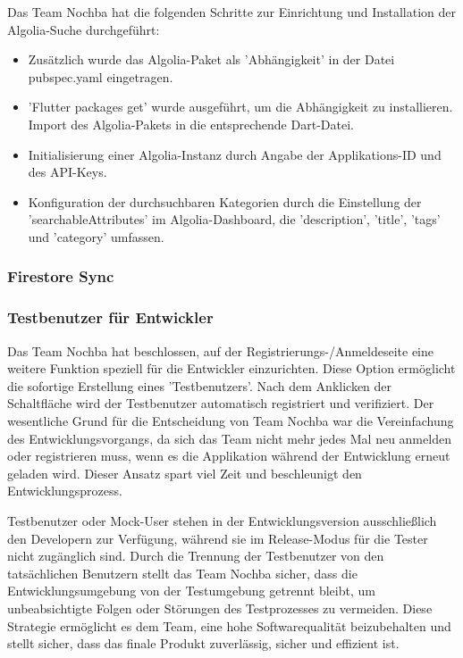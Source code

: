 Das Team Nochba hat die folgenden Schritte zur Einrichtung und Installation der Algolia-Suche durchgeführt:

\begin{itemize}
  \item {Zusätzlich wurde das Algolia-Paket als 'Abhängigkeit' in der Datei pubspec.yaml eingetragen.}
  \item {'Flutter packages get' wurde ausgeführt, um die Abhängigkeit zu installieren.
        Import des Algolia-Pakets in die entsprechende Dart-Datei.}
  \item {Initialisierung einer Algolia-Instanz durch Angabe der Applikations-ID und des API-Keys.}
  \item {Konfiguration der durchsuchbaren Kategorien durch die Einstellung der 'searchableAttributes' im Algolia-Dashboard, die 'description', 'title', 'tags' und 'category' umfassen.}
\end{itemize}

\subsubsection{Firestore Sync}

\subsubsection{Testbenutzer für Entwickler}

Das Team Nochba hat beschlossen, auf der Registrierungs-/Anmeldeseite eine weitere Funktion speziell für die Entwickler einzurichten. Diese Option ermöglicht die sofortige Erstellung eines 'Testbenutzers'. Nach dem Anklicken der Schaltfläche wird der Testbenutzer automatisch registriert und verifiziert. Der wesentliche Grund für die Entscheidung von Team Nochba war die Vereinfachung des Entwicklungsvorgangs, da sich das Team nicht mehr jedes Mal neu anmelden oder registrieren muss, wenn es die Applikation während der Entwicklung erneut geladen wird. Dieser Ansatz spart viel Zeit und beschleunigt den Entwicklungsprozess.

Testbenutzer oder Mock-User stehen in der Entwicklungsversion ausschließlich den Developern zur Verfügung, während sie im Release-Modus für die Tester nicht zugänglich sind. Durch die Trennung der Testbenutzer von den tatsächlichen Benutzern stellt das Team Nochba sicher, dass die Entwicklungsumgebung von der Testumgebung getrennt bleibt, um unbeabsichtigte Folgen oder Störungen des Testprozesses zu vermeiden. Diese Strategie ermöglicht es dem Team, eine hohe Softwarequalität beizubehalten und stellt sicher, dass das finale Produkt zuverlässig, sicher und effizient ist.


